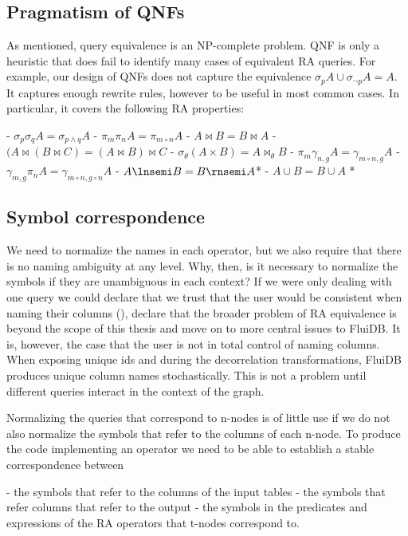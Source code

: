 \subsection{Pragmatism of QNFs}

As mentioned, query equivalence is an NP-complete problem. QNF is only a heuristic
that does fail to identify many cases of equivalent RA queries.
For example, our design of QNFs does not capture the equivalence
\(\sigma_p A \cup \sigma_{\neg p} A = A\). It captures enough rewrite rules, however to be
useful in most common cases. In particular, it covers the following RA properties:

- \(\sigma_p \sigma_q A = \sigma_{p \land q} A\)
- \(\pi_m \pi_{n} A = \pi_{m \circ n} A\)
- \(A \Join B = B \Join A\)
- \((A \Join (B \Join C) = (A \Join B) \Join C\)
- \(\sigma_\theta (A \times B) = A \Join_\theta B\)
- \(\pi_m \gamma_{n,g} A = \gamma_{m \circ n,g} A \)
- \(\gamma_{m,g} \pi_n A = \gamma_{m \circ n,g \circ n} A \)
- \(A \lnsemi B = B \rnsemi A \)*
- \(A \cup B = B \cup A \) *

\subsection{Symbol correspondence}
\label{sec:symbol_correspondence}

We need to normalize the names in each operator, but we also require
that there is no naming ambiguity at any level. Why, then, is it necessary
to normalize the symbols if they are unambiguous in each context? If
we were only dealing with one query we could declare that we trust
that the user would be consistent when naming their columns
(), declare that the broader problem
of RA equivalence is beyond the scope of this thesis and move on to
more central issues to FluiDB. It is, however, the case that the user is not in
total control of naming columns. When exposing
unique ids and during the decorrelation transformations, FluiDB
produces unique column names stochastically. This is not a
problem until different queries interact in the context of the
graph.

Normalizing the queries that correspond to n-nodes is of little use
if we do not also normalize the symbols that refer to the columns
of each n-node. To produce the code implementing
an operator we need to be able to establish a stable correspondence
between

- the symbols that refer to the columns of the input tables
- the symbols that refer columns that refer to the output
- the symbols in the predicates and expressions of the RA operators that t-nodes correspond to.

